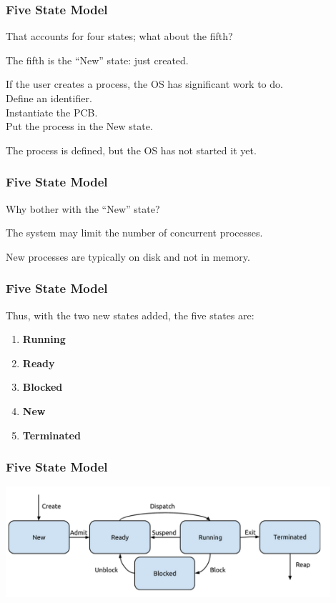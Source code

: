 \begin{frame}
\frametitle{Five State Model}
That accounts for four states; what about the fifth?

The fifth is the ``New'' state: just created.

If the user creates a process, the OS has significant work to do.\\
\quad Define an identifier.\\
\quad Instantiate the PCB.\\
\quad Put the process in the New state.

The process is defined, but the OS has not started it yet.

\end{frame}

\begin{frame}
\frametitle{Five State Model}
Why bother with the ``New'' state?

The system may limit the number of concurrent processes.

New processes are typically on disk and not in memory.

\end{frame}

\begin{frame}
\frametitle{Five State Model}

Thus, with the two new states added, the five states are:

\begin{enumerate}
 \item \textbf{Running}
 \item \textbf{Ready}
 \item \textbf{Blocked}
 \item \textbf{New}
 \item \textbf{Terminated}
\end{enumerate}

\end{frame}

\begin{frame}
\frametitle{Five State Model}

\begin{center}
\includegraphics[width=0.9\textwidth]{images/5-state-model.png}
\end{center}

\end{frame}

